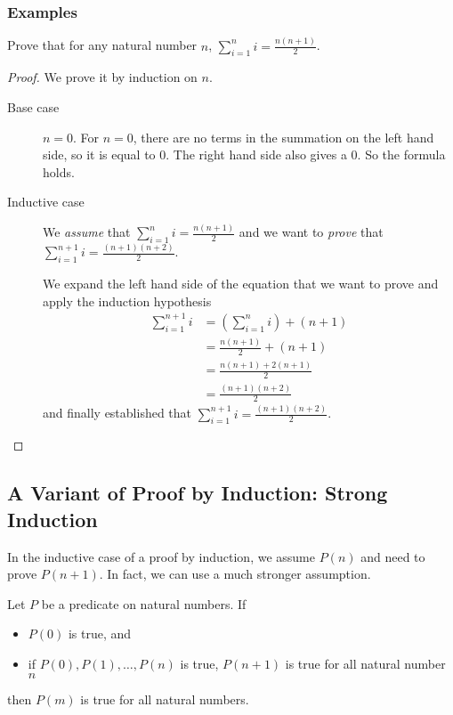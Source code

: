 \documentclass[11pt]{article}
\begin{document}
\subsubsection{Examples}

Prove that for any natural number $n$, $\sum_{i=1}^n i = \frac{n(n+1)}{2}$.

\begin{proof}
We prove it by induction on $n$.

\begin{description}
\item[Base case] $n = 0$. For $n = 0$, there are no terms in the summation on the left
hand side, so it is equal to $0$. The right hand side also gives a $0$. So the formula
holds.
\item[Inductive case] We \emph{assume} that $\sum_{i=1}^n i = \frac{n(n+1)}{2}$ and we
want to \emph{prove} that $\sum_{i=1}^{n+1} i = \frac{(n+1)(n+2)}{2}$.

We expand the left hand side of the equation that we want to prove and apply the induction
hypothesis
\begin{align*}
\sum_{i=1}^{n+1} i &= (\sum_{i=1}^n i) + (n+1) \\
&= \frac{n(n+1)}{2} + (n+1) \\
&= \frac{n(n+1)+2(n+1)}{2} \\
&= \frac{(n+1)(n+2)}{2}
\end{align*}
and finally established that $\sum_{i=1}^{n+1} i = \frac{(n+1)(n+2)}{2}$.
\end{description}
\end{proof}

\subsection{A Variant of Proof by Induction: Strong Induction}

In the inductive case of a proof by induction, we assume $P(n)$ and need to prove $P(n+1)$.
In fact, we can use a much stronger assumption.

\begin{theorem}
Let $P$ be a predicate on natural numbers. If
\begin{itemize}
\item $P(0)$ is true, and
\item if $P(0), P(1), \dots, P(n)$ is true, $P(n+1)$ is true for all natural number $n$
\end{itemize}
then $P(m)$ is true for all natural numbers.
\end{theorem}
\end{document}
